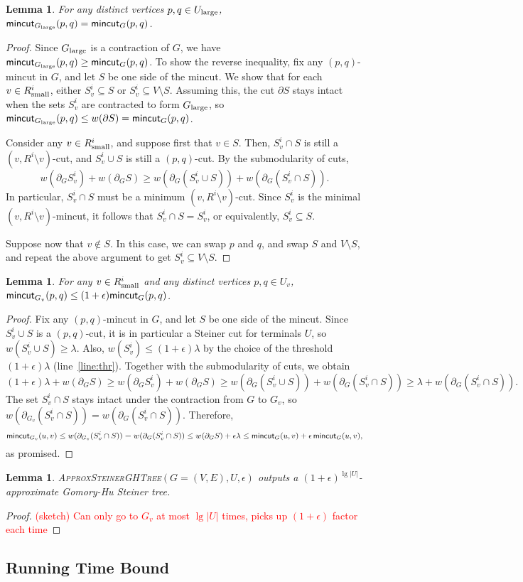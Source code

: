 \documentclass{article}
\newcommand{\sm}{\setminus}
\newcommand{\s}{\subseteq}
\newcommand{\e}{\epsilon}
\newcommand{\la}{\lambda}
\newcommand{\pt}{\partial}
\newcommand{\1}{\mathbbm 1}
\newtheorem{lemma}[theorem]{Lemma}
\newcommand{\BL}{\begin{lemma}}
\newcommand{\EL}{\end{lemma}}
\newcommand{\BP}{\begin{proof}}
\newcommand{\EP}{\end{proof}}
\newcommand{\alert}{\textcolor{red}}
\newcommand{\leml}[1]{\label{lem:#1}}
\renewcommand{\line}[1]{line~\ref{line:#1}}
\newcommand{\mincut}{\textsf{\textup{mincut}}}
\newcommand{\sma}{{\textup{small}}}
\newcommand{\lar}{{\textup{large}}}
\begin{document}
\BL\leml{large}
For any distinct vertices $p,q\in U_\lar$, $\mincut_{G_\lar}(p,q) = \mincut_G(p,q)$.
\EL
\BP
Since $G_\lar$ is a contraction of $G$, we have $\mincut_{G_\lar}(p,q) \ge \mincut_G(p,q)$. To show the reverse inequality, fix any $(p,q)$-mincut in $G$, and let $S$ be one side of the mincut. We show that for each $v\in  R^i_\sma$, either $S^i_v\s S$ or $S^i_v\s V\sm S$. Assuming this, the cut $\pt S$ stays intact when the sets $S^i_v$ are contracted to form $G_\lar$, so $\mincut_{G_\lar}(p,q) \le w(\pt S) = \mincut_G(p,q)$.

Consider any $v\in R^i_\sma$, and suppose first that $v\in S$. Then, $S^i_v\cap S$ is still a $(v,R^i\sm v)$-cut, and $S^i_v\cup S$ is still a $(p,q)$-cut. By the submodularity of cuts,
\[ w(\pt_GS^i_v) + w(\pt_GS) \ge w(\pt_G(S^i_v\cup S)) + w(\pt_G(S^i_v\cap S)). \]
In particular, $S^i_v\cap S$ must be a minimum $(v,R^i\sm v)$-cut. Since $S^i_v$ is the minimal $(v,R^i\sm v)$-mincut, it follows that $S^i_v\cap S = S^i_v$, or equivalently, $S^i_v\s S$.

Suppose now that $v\notin S$. In this case, we can swap $p$ and $q$, and swap $S$ and $V\sm S$, and repeat the above argument to get $S^i_v\s V\sm S$.
\EP

\BL\leml{small}
For any $v\in  R^i_\sma$ and any distinct vertices $p,q\in U_v$, $\mincut_{G_v}(p,q)\le(1+\e)\mincut_G(p,q)$.
\EL
\BP
Fix any $(p,q)$-mincut in $G$, and let $S$ be one side of the mincut. Since $S^i_v\cup S$ is a $(p,q)$-cut, it is in particular a Steiner cut for terminals $U$, so $w(S^i_v\cup S)\ge\la$. Also, $w(S^i_v)\le(1+\e)\la$ by the choice of the threshold $(1+\e)\la$ (\line{thr}). Together with the submodularity of cuts, we obtain
\[ (1+\e)\la+w(\pt_GS) \ge w(\pt_GS^i_v) + w(\pt_GS) \ge w(\pt_G(S^i_v\cup S)) + w(\pt_G(S^i_v\cap S)) \ge \la + w(\pt_G(S^i_v\cap S)) .\]
The set $S^i_v\cap S$ stays intact under the contraction from $G$ to $G_v$, so $w(\pt_{G_v}(S^i_v\cap S))=w(\pt_G(S^i_v\cap S))$. Therefore,
\[ \mincut_{G_v}(u,v)\le w(\pt_{G_v}(S^i_v\cap S))=w(\pt_G(S^i_v\cap S)) \le w(\pt_GS)+\e\la \le \mincut_G(u,v) + \e\,\mincut_G(u,v) ,\]
as promised.
\EP

\BL
\textsc{ApproxSteinerGHTree}$(G=(V,E),U,\e)$ outputs a $(1+\e)^{\lg|U|}$-approximate Gomory-Hu Steiner tree.
\EL
\BP
\alert{(sketch) Can only go to $G_v$ at most $\lg|U|$ times, picks up $(1+\e)$ factor each time}
\EP

\subsection{Running Time Bound}
\end{document}
